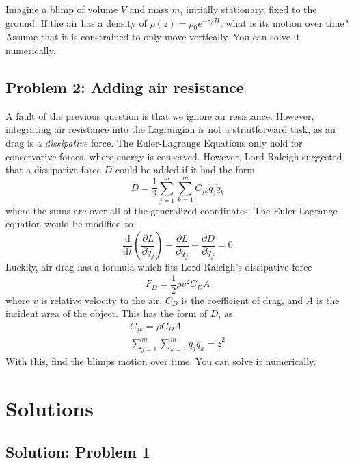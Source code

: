 \documentclass[titlepage]{article}
\begin{document}
Imagine a blimp of volume $V$ and mass $m$, initially stationary, fixed to the ground. If the air has a density of $\rho(z) = \rho_0 e^{-{z / H}} $, what is its motion over time? Assume that it is constrained to only move vertically. You can solve it numerically.

\subsection{Problem 2: Adding air resistance}

A fault of the previous question is that we ignore air resistance. However, integrating air resistance into the Lagrangian is not a straitforward task, as air drag is a \textit{dissipative} force. The Euler-Lagrange Equations only hold for conservative forces, where energy is conserved. However, Lord Raleigh suggested \cite{raleigh} that a dissipative force $D$ could be added if it had the form 
\[
    D=\frac{1}{2} \sum_{j=1}^{m} \sum_{k=1}^{m} C_{j k} \dot{q}_{j} \dot{q}_{k} 
\]
where the sums are over all of the generalized coordinates. The Euler-Lagrange equation would be modified to
\[
    \frac{\mathrm{d}}{\mathrm{d} t}\left(\frac{\partial L}{\partial \dot{q}_{j}}\right)-\frac{\partial L}{\partial q_{j}}+\frac{\partial D}{\partial \dot{q}_{j}} = 0 
\]
Luckily, air drag has a formula which fits Lord Raleigh's dissipative force \cite{drag}
\[
    F_{D}=\frac{1}{2} \rho v^{2} C_{D} A 
\]
where $v$ is relative velocity to the air, $C_D$ is the coefficient of drag, and $A$ is the incident area of the object. This has the form of $D$, as 
\[
    \begin{split}
        C_{jk} = \rho C_D A \\
        \sum_{j=1}^{m} \sum_{k=1}^{m} \dot{q}_{j} \dot{q}_{k} = \dot {z}^2
    \end{split}
\]
With this, find the blimps motion over time. You can solve it numerically.


\newpage

\section{Solutions}

\subsection{Solution: Problem 1}
\end{document}
